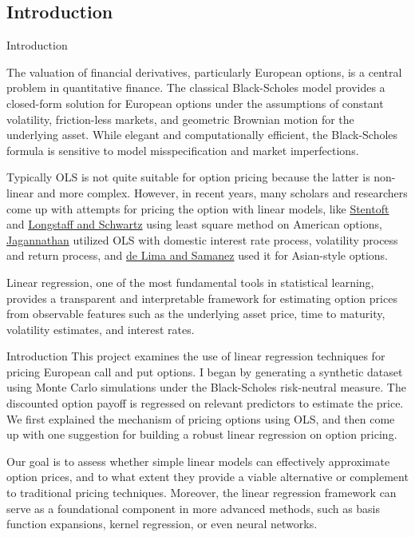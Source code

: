 \documentclass[aspectratio=169,xcolor=dvipsnames]{beamer}
\begin{document}
\subsection{Introduction}
\begin{frame}{Introduction}
	
	The valuation of financial derivatives, particularly European options, is a central problem in quantitative finance. The classical Black-Scholes model provides a closed-form solution for European options under the assumptions of constant volatility, friction-less markets, and geometric Brownian motion for the underlying asset. While elegant and computationally efficient, the Black-Scholes formula is sensitive to model misspecification and market imperfections.
	
	Typically OLS is not quite suitable for option pricing because the latter is non-linear and more complex. However, in recent years, many scholars and researchers come up with attempts for pricing the option with linear models, like \href{https://papers.ssrn.com/sol3/papers.cfm?abstract_id=1963057}{Stentoft} and \href{https://people.math.ethz.ch/~hjfurrer/teaching/LongstaffSchwartzAmericanOptionsLeastSquareMonteCarlo.pdf}{Longstaff and Schwartz} using least square method on American options, \href{https://www.scirp.org/journal/paperinformation?paperid=82776}{Jagannathan} utilized OLS with domestic interest rate process, volatility process and return process, and \href{https://jfin-swufe.springeropen.com/articles/10.1186/s40854-015-0019-0}{de Lima and Samanez} used it for Asian-style options. 
	
	Linear regression, one of the most fundamental tools in statistical learning, provides a transparent and interpretable framework for estimating option prices from observable features such as the underlying asset price, time to maturity, volatility estimates, and interest rates.
\end{frame}
	\begin{frame}{Introduction}
	This project examines the use of linear regression techniques for pricing European call and put options. I began by generating a synthetic dataset using Monte Carlo simulations under the Black-Scholes risk-neutral measure. The discounted option payoff is regressed on relevant predictors to estimate the price. We first explained the mechanism of pricing options using OLS, and then come up with one suggestion for building a robust linear regression on option pricing. 
	
	Our goal is to assess whether simple linear models can effectively approximate option prices, and to what extent they provide a viable alternative or complement to traditional pricing techniques. Moreover, the linear regression framework can serve as a foundational component in more advanced methods, such as basis function expansions, kernel regression, or even neural networks.
\end{frame}
	
\end{document}
